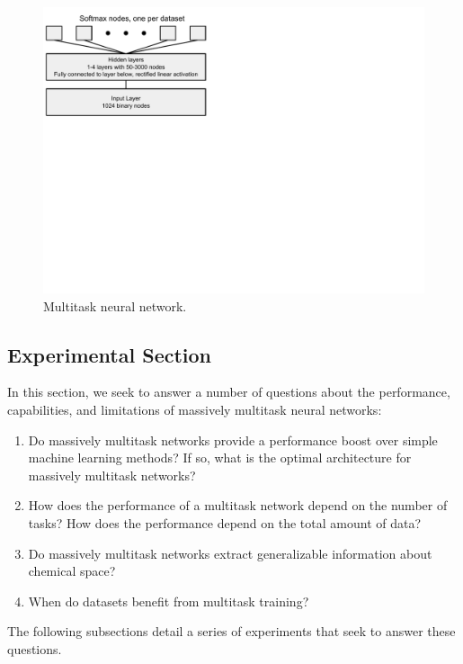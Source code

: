 \begin{figure}[ht]
\centering
\includegraphics[trim=0 4.5in 5.5in 0,clip,width=0.9\linewidth]{Images/network.pdf}
\caption{Multitask neural network.}
\label{fig:network}
\end{figure}

\subsection{Experimental Section}

In this section, we seek to answer a number of questions about the
performance, capabilities, and limitations of massively multitask neural
networks:

\begin{enumerate}
\itemsep0em
\item Do massively multitask networks provide a performance boost over
  simple machine learning methods? If so, what is the optimal architecture
  for massively multitask networks?
\item How does the performance of a multitask network depend on the number
  of tasks? How does the performance depend on the total amount of data?
\item Do massively multitask networks extract generalizable information
  about chemical space?
\item When do datasets benefit from multitask training?
\end{enumerate}

The following subsections detail a series of experiments that seek to
answer these questions.

